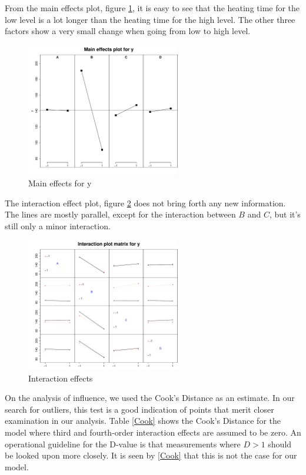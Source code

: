 From the main effects plot, figure \ref{fig:mainEff}, it is easy to see that the heating time for the low level is a lot longer than the heating time for the high level. The other three factors show a very small change when going from low to high level.

\begin{figure}[H]
    \centering
    \includegraphics[width=0.6\textwidth]{PDF/mainEffects4factors.pdf}
    \caption{Main effects for y}
    \label{fig:mainEff}
\end{figure}

The interaction effect plot, figure \ref{fig:interaction} does not bring forth any new information. The lines are mostly parallel, except  for the interaction between $B$ and $C$, but it's still only a minor interaction.

\begin{figure}[H]
    \centering
    \includegraphics[width=0.6\textwidth]{PDF/interactionPlot4factors.pdf}
    \caption{Interaction effects}
    \label{fig:interaction}
\end{figure}

On the analysis of influence, we used the Cook's Distance as an estimate. In our search for outliers, this test is a good indication of points that merit closer examination in our analysis. Table \ref{Cook} shows the Cook's Distance for the model where third and fourth-order interaction effects are assumed to be zero. An operational guideline for the D-value is that measurements where $D>1$ should be looked upon more closely. It is seen by \ref{Cook} that this is not the case for our model.


